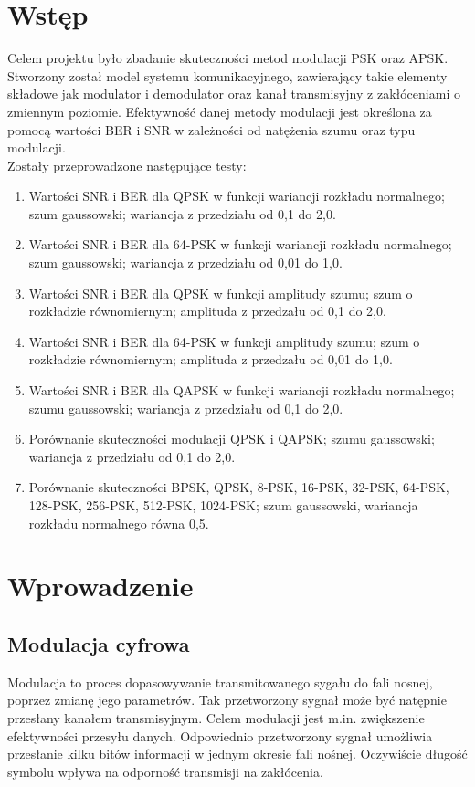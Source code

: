 \documentclass{article}
\begin{document}
\section{Wstęp}
	Celem projektu było zbadanie skuteczności metod modulacji PSK oraz APSK. Stworzony został model systemu komunikacyjnego, zawierający takie elementy składowe jak modulator i demodulator oraz kanał transmisyjny z zakłóceniami o zmiennym poziomie. Efektywność danej metody modulacji jest określona za pomocą wartości BER i SNR w zależności od natężenia szumu oraz typu modulacji.\\
	Zostały przeprowadzone następujące testy:
	\begin{enumerate}
		\item Wartości SNR i BER dla QPSK w funkcji wariancji rozkładu normalnego; szum gaussowski; wariancja z przedziału od 0,1 do 2,0.
		\item Wartości SNR i BER dla 64-PSK w funkcji wariancji rozkładu normalnego; szum gaussowski; wariancja z przedziału od 0,01 do 1,0.
		\item Wartości SNR i BER dla QPSK w funkcji amplitudy szumu; szum o rozkładzie równomiernym; amplituda z przedzału od 0,1 do 2,0.
		\item Wartości SNR i BER dla 64-PSK w funkcji amplitudy szumu; szum o rozkładzie równomiernym; amplituda z przedzału od 0,01 do 1,0.
		\item Wartości SNR i BER dla QAPSK w funkcji wariancji rozkładu normalnego; szumu gaussowski; wariancja z przedziału od 0,1 do 2,0.
		\item Porównanie skuteczności modulacji QPSK i QAPSK; szumu gaussowski; wariancja z przedziału od 0,1 do 2,0.
		\item Porównanie skuteczności BPSK, QPSK, 8-PSK, 16-PSK, 32-PSK, 64-PSK, 128-PSK, 256-PSK, 512-PSK, 1024-PSK; szum gaussowski, wariancja rozkładu normalnego równa 0,5.
	\end{enumerate}

\section{Wprowadzenie}
	\subsection{Modulacja cyfrowa}
		Modulacja to proces dopasowywanie transmitowanego sygału do fali nosnej, poprzez zmianę jego parametrów. Tak przetworzony sygnał może być natępnie przesłany kanałem transmisyjnym. Celem modulacji jest m.in. zwiększenie efektywności przesyłu danych. Odpowiednio przetworzony sygnał umożliwia przesłanie kilku bitów informacji w jednym okresie fali nośnej. Oczywiście długość symbolu wpływa na odporność transmisji na zakłócenia.
\end{document}
